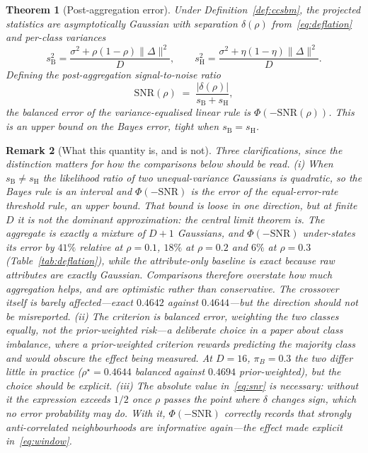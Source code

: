 \documentclass[onecolumn,pdflatex,sn-basic,Numbered]{sn-jnl}
\theoremstyle{thmstyleone}
\newtheorem{theorem}{Theorem}
\theoremstyle{thmstylethree}
\newtheorem{remark}[theorem]{Remark}
\begin{document}
\begin{theorem}[Post-aggregation error]
\label{thm:error}
Under Definition~\ref{def:ccsbm}, the projected statistics are asymptotically
Gaussian with separation $\delta(\rho)$ from~\eqref{eq:deflation} and per-class
variances
\begin{equation}
    s_{\mathrm{B}}^2 = \frac{\sigma^2 + \rho(1-\rho)\|\Delta\|^2}{D},
    \qquad
    s_{\mathrm{H}}^2 = \frac{\sigma^2 + \eta(1-\eta)\|\Delta\|^2}{D}.
    \label{eq:variances}
\end{equation}
Defining the post-aggregation signal-to-noise ratio
\begin{equation}
    \mathrm{SNR}(\rho) \;=\; \frac{|\delta(\rho)|}{s_{\mathrm{B}} + s_{\mathrm{H}}},
    \label{eq:snr}
\end{equation}
the balanced error of the variance-equalised linear rule is
$\Phi(-\mathrm{SNR}(\rho))$. This is an upper bound on the Bayes error, tight when
$s_{\mathrm{B}} = s_{\mathrm{H}}$.
\end{theorem}

\begin{remark}[What this quantity is, and is not]
\label{rem:not-bayes}
Three clarifications, since the distinction matters for how the comparisons below
should be read. (i) When $s_{\mathrm{B}} \neq s_{\mathrm{H}}$ the likelihood ratio of
two unequal-variance Gaussians is quadratic, so the Bayes rule is an interval and
$\Phi(-\mathrm{SNR})$ is the error of the equal-error-rate \emph{threshold} rule, an
upper bound. That bound is loose in one direction, but at finite $D$ it is not the
dominant approximation: the central limit theorem is. The aggregate is exactly a
mixture of $D+1$ Gaussians, and $\Phi(-\mathrm{SNR})$ \emph{under}-states its error
by $41\%$ relative at $\rho = 0.1$, $18\%$ at $\rho = 0.2$ and $6\%$ at
$\rho = 0.3$ (Table~\ref{tab:deflation}), while the attribute-only baseline is exact
because raw attributes are exactly Gaussian. Comparisons therefore \emph{overstate}
how much aggregation helps, and are optimistic rather than conservative. The
crossover itself is barely affected---exact $0.4642$ against $0.4644$---but the
direction should not be misreported.
(ii) The criterion is \emph{balanced} error, weighting the two classes equally, not
the prior-weighted risk---a deliberate choice in a paper about class imbalance,
where a prior-weighted criterion rewards predicting the majority class and would
obscure the effect being measured. At $D=16$, $\pi_B=0.3$ the two differ little in
practice ($\rho^\star = 0.4644$ balanced against $0.4694$ prior-weighted), but the
choice should be explicit. (iii) The absolute value in~\eqref{eq:snr} is necessary:
without it the expression exceeds $1/2$ once $\rho$ passes the point where
$\delta$ changes sign, which no error probability may do. With it,
$\Phi(-\mathrm{SNR})$ correctly records that strongly anti-correlated neighbourhoods
are informative again---the effect made explicit in~\eqref{eq:window}.
\end{remark}
\end{document}

